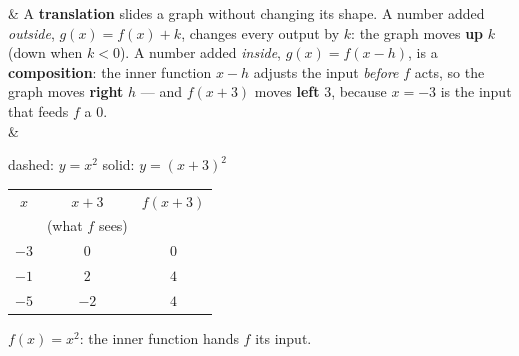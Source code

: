 \documentclass[10pt]{article}
\begin{document}
\small
\begin{guidednotes}
 &
A \textbf{translation} slides a graph without changing its shape. A number added
\emph{outside}, $g(x) = f(x) + k$, changes every output by $k$: the graph moves \textbf{up} $k$
(down when $k < 0$). A number added \emph{inside}, $g(x) = f(x - h)$, is a
\textbf{composition}: the inner function $x - h$ adjusts the input \emph{before} $f$ acts, so
the graph moves \textbf{right} $h$ --- and $f(x + 3)$ moves \textbf{left} 3, because $x = -3$
is the input that feeds $f$ a 0.
\\
& \begin{minipage}[c]{0.52\linewidth}
\centering
{}

{\footnotesize dashed: $y = x^2$ \quad solid: $y = (x + 3)^2$}
\end{minipage}\hfill
\begin{minipage}[c]{0.44\linewidth}
\centering
{\renewcommand{\arraystretch}{1.3}%
\begin{tabular}{|c|c|c|}
\hline
$x$ & $x + 3$ & $f(x + 3)$ \\
    & \scriptsize(what $f$ sees) & \\ \hline
$-3$ & $0$ & $0$ \\
$-1$ & $2$ & $4$ \\
$-5$ & $-2$ & $4$ \\ \hline
\end{tabular}}

\vspace{6pt}
{\footnotesize $f(x) = x^2$: the inner function hands $f$ its input.}
\end{minipage}


\end{guidednotes}
\end{document}
